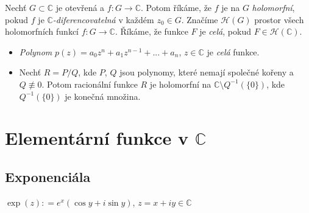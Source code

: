 
\begin{definition}
Nechť $G\subset \mathbb{C}$ je otevřená %
a $f \colon G \to \mathbb{C}$.
Potom říkáme, že $f$ je na $G$ \emph{holomorfní}, pokud $f$ je  $\mathbb{C}$\emph{-diferencovatelná} v každém $z_{0}\in {G}$. Značíme $\mathcal{H}(G)$ prostor všech holomorfních funkcí $f \colon G \to \mathbb{C}$. Říkáme, že funkce $F$ je \emph{celá}, pokud $F\in \mathcal{H}(\mathbb{C})$.
\end{definition}
\begin{example}\mbox{}
\begin{itemize}
    \item \emph{Polynom} $p(z) = a_0z^{n}+a_1z^{n-1}+...+a_n$, $z\in \mathbb{C}$ je \emph{celá} funkce.
    \item Nechť $R=P/Q$, kde $P$, $Q$ jsou polynomy, které nemají společné kořeny a $Q\not\equiv 0$. Potom racionální funkce $R$ je holomorfní na $\mathbb{C}\setminus Q^{-1}(\{0\})$, kde $Q^{-1}(\{0\})$ je konečná množina.
\end{itemize}    
\end{example}


\section{Elementární funkce v \texorpdfstring{$\mathbb{C}$}{C}}
\subsection{Exponenciála}

\begin{definition}
$\exp(z)\colon=e^{x}(\cos y + i\sin y)$, $z=x+i y\in \mathbb{C}$
\end{definition}

